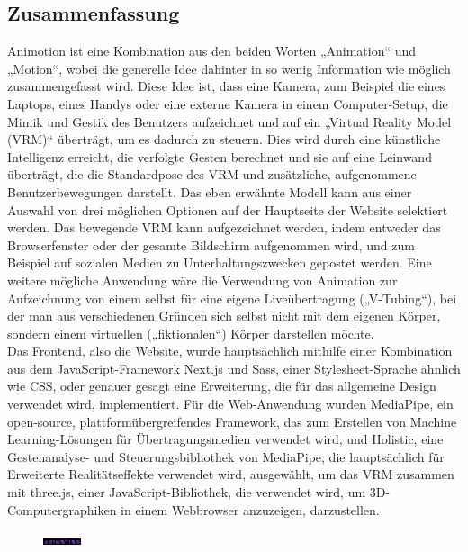 \newpage
\begin{spacing}{1}
    \chapter*{Zusammenfassung}
\end{spacing}
Animotion ist eine Kombination aus den beiden Worten „Animation“ und „Motion“, wobei die generelle Idee dahinter in so wenig Information wie möglich zusammengefasst wird. Diese Idee ist, dass eine Kamera, zum Beispiel die eines Laptops, eines Handys oder eine externe Kamera in einem Computer-Setup, die Mimik und Gestik des Benutzers aufzeichnet und auf ein „Virtual Reality Model (VRM)“ überträgt, um es dadurch zu steuern. Dies wird durch eine künstliche Intelligenz erreicht, die verfolgte Gesten berechnet und sie auf eine Leinwand überträgt, die die Standardpose des VRM und zusätzliche, aufgenommene Benutzerbewegungen darstellt. Das eben erwähnte Modell kann aus einer Auswahl von drei möglichen Optionen auf der Hauptseite der Website selektiert werden. Das bewegende VRM kann aufgezeichnet werden, indem entweder das Browserfenster oder der gesamte Bildschirm aufgenommen wird, und zum Beispiel auf sozialen Medien zu Unterhaltungszwecken gepostet werden. Eine weitere mögliche Anwendung wäre die Verwendung von Animation zur Aufzeichnung von einem selbst für eine eigene Liveübertragung („V-Tubing“), bei der man aus verschiedenen Gründen sich selbst nicht mit dem eigenen Körper, sondern einem virtuellen („fiktionalen“) Körper darstellen möchte.
\\
Das Frontend, also die Website, wurde hauptsächlich mithilfe einer Kombination aus dem JavaScript-Framework Next.js und Sass, einer Stylesheet-Sprache ähnlich wie CSS, oder genauer gesagt eine Erweiterung, die für das allgemeine Design verwendet wird, implementiert. Für die Web-Anwendung wurden MediaPipe, ein open-source, plattformübergreifendes Framework, das zum Erstellen von Machine Learning-Lösungen für Übertragungsmedien verwendet wird, und Holistic, eine Gestenanalyse- und Steuerungsbibliothek von MediaPipe, die hauptsächlich für Erweiterte Realitätseffekte verwendet wird, ausgewählt, um das VRM zusammen mit three.js, einer JavaScript-Bibliothek, die verwendet wird, um 3D-Computergraphiken in einem Webbrowser anzuzeigen, darzustellen.
\\
\begin{figure}[htb]
    \centering
    \includegraphics[width=0.1\textwidth]{pics/animotionlogo.png}
\end{figure}